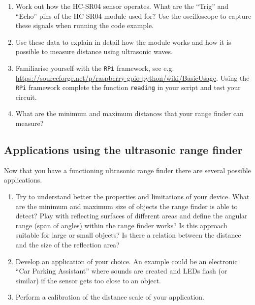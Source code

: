 \begin{enumerate}
\item Work out how the HC-SR04 sensor operates.
What are the ``Trig'' and ``Echo'' pins of the HC-SR04 module used for?
Use the oscilloscope to capture these signals when running the code example. 

\item Use these data to explain in detail how the module works and how it is possible to measure distance using ultrasonic waves.

\item Familiarise yourself with the \texttt{RPi} framework, see e.g. \url{https://sourceforge.net/p/raspberry-gpio-python/wiki/BasicUsage}.
Using the \texttt{RPi} framework complete the function \texttt{reading} in your script and test your circuit.

\item What are the minimum and maximum distances that your range finder can measure? 
\end{enumerate}

\subsection{Applications using the ultrasonic range finder}

Now that you have a functioning ultrasonic range finder there are several possible applications.

\begin{enumerate}

\item	Try to understand better the properties and limitations of your device.
What are the minimum and maximum size of objects the range finder is able to detect?
Play with reflecting surfaces of different areas and define the angular range (span of angles) within the range finder works?
Is this approach suitable for large or small objects? Is there a relation between the distance and the size of the reflection area?

\item Develop an application of your choice. An example could be an electronic ``Car Parking Assistant'' where sounds are created and LEDs flash (or similar) if the sensor gets too close to an object.

\item Perform a calibration of the distance scale of your application.

\end{enumerate}

